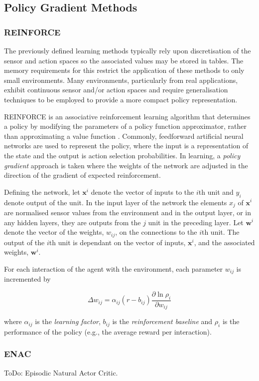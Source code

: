 \subsection{Policy Gradient Methods}

\subsubsection{REINFORCE}
\label{sec:reinforce}
The previously defined learning methods typically rely upon discretisation of
the sensor and action spaces so the associated values may be stored in tables.
The memory requirements for this restrict the application of these methods to
only small environments.  Many environments, particularly from real
applications, exhibit continuous sensor and/or action spaces and require
generalisation techniques to be employed to provide a more compact policy
representation.

REINFORCE is an associative reinforcement learning algorithm that determines
a policy by modifying the parameters of a policy function approximator, rather
than approximating a value function \cite{williams:reinforce}.  Commonly,
feedforward artificial neural networks are used to represent the policy, where
the input is a representation of the state and the output is action selection
probabilities.  In learning, a \textit{policy gradient} approach is taken where
the weights of the network are adjusted in the direction of the gradient of
expected reinforcement.

Defining the network, let $\mathbf{x}^i$ denote the vector of inputs to the
$i$th unit and $y_i$ denote output of the unit.  In the input layer of the
network the elements $x_j$ of $\mathbf{x}^i$ are normalised sensor values from
the environment and in the output layer, or in any hidden layers, they are
outputs from the $j$ unit in the preceding layer.  Let $\mathbf{w}^i$ denote
the vector of the weights, $w_{ij}$, on the connections to the $i$th unit.  The
output of the $i$th unit is dependant on the vector of inputs, $\mathbf{x}^i$,
and the associated weights, $\mathbf{w}^i$.

For each interaction of the agent with the environment, each parameter $w_{ij}$
is incremented by

\begin{equation}
\label{eq:reinforce}
\Delta w_{ij} = \alpha_{ij}(r - b_{ij})\frac{\partial\ln\rho_i}{\partial
w_{ij}}
\end{equation}

where $\alpha_{ij}$ is the \textit{learning factor}, $b_{ij}$ is the
\textit{reinforcement baseline} and $\rho_i$ is the performance of the policy
(e.g., the average reward per interaction).

\subsubsection{ENAC}
\label{sec:enac}
ToDo: Episodic Natural Actor Critic\cite{peters:enac}.
